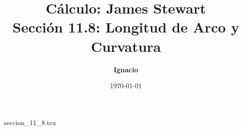 \documentclass[11pt,spanish,oneside]{report}
\title{\textbf{Cálculo: James Stewart} \\ \Large Sección 11.8: Longitud de Arco y Curvatura}
\author{\textbf{Ignacio}}
\date{\today}
\begin{document}
\maketitle

{seccion_11_8.tex}
\end{document}

